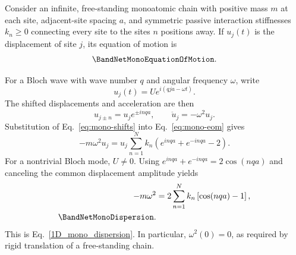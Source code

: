 
Consider an infinite, free-standing monoatomic chain with positive mass $m$ at
each site, adjacent-site spacing $a$, and symmetric passive interaction
stiffnesses $k_n\geq0$
connecting every site to the sites $n$ positions away. If $u_j(t)$ is the
displacement of site $j$, its equation of motion is
\begin{equation}
    \BandNetMonoEquationOfMotion.
    \label{eq:mono-eom}
\end{equation}

For a Bloch wave with wave number $q$ and angular frequency $\omega$, write
\begin{equation}
    u_j(t)=Ue^{i(qja-\omega t)}.
    \label{eq:mono-bloch}
\end{equation}
The shifted displacements and acceleration are then
\begin{equation}
    u_{j\pm n}=u_je^{\pm inqa},
    \qquad
    \ddot{u}_j=-\omega^2u_j.
    \label{eq:mono-shifts}
\end{equation}
Substitution of Eq.~\eqref{eq:mono-shifts} into Eq.~\eqref{eq:mono-eom} gives
\begin{equation}
    -m\omega^2u_j
    =u_j\sum_{n=1}^{N}k_n
    \left(e^{inqa}+e^{-inqa}-2\right).
    \label{eq:mono-substitution}
\end{equation}
For a nontrivial Bloch mode, $U\neq0$. Using
$e^{inqa}+e^{-inqa}=2\cos(nqa)$ and canceling the common displacement amplitude
yields
\begin{align}
    -m\omega^2
    &=2\sum_{n=1}^{N}k_n\left[\cos(nqa)-1\right], \\
    \BandNetMonoDispersion.
    \label{eq:mono-derived}
\end{align}
This is Eq.~\eqref{1D_mono_dispersion}. In particular, $\omega^2(0)=0$, as
required by rigid translation of a free-standing chain.
